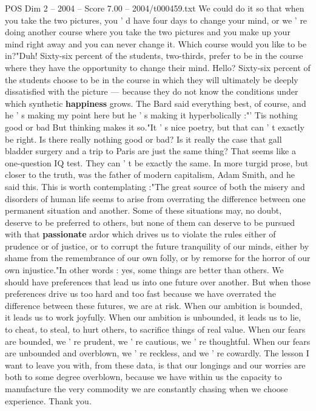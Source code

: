 \begin{textsample}{POS Dim 2 – 2004 – Score 7.00 – 2004/t000459.txt}
We could do it so that when you take the two pictures, you ' d have four days to change your mind, or we ' re doing another course where you take the two pictures and you make up your mind right away and you can never change it.
Which course would you like to be in?"Duh!
Sixty-six percent of the students, two-thirds, prefer to be in the course where they have the opportunity to change their mind.
Hello?
Sixty-six percent of the students choose to be in the course in which they will ultimately be deeply dissatisfied with the picture — because they do not know the conditions under which synthetic \textbf{happiness} grows.
The Bard said everything best, of course, and he ' s making my point here but he ' s making it hyperbolically :"' Tis nothing good or bad But thinking makes it so."It ' s nice poetry, but that can ' t exactly be right.
Is there really nothing good or bad?
Is it really the case that gall bladder surgery and a trip to Paris are just the same thing?
That seems like a one-question IQ test.
They can ' t be exactly the same.
In more turgid prose, but closer to the truth, was the father of modern capitalism, Adam Smith, and he said this.
This is worth contemplating :"The great source of both the misery and disorders of human life seems to arise from overrating the difference between one permanent situation and another.
Some of these situations may, no doubt, deserve to be preferred to others, but none of them can deserve to be pursued with that \textbf{passionate} ardor which drives us to violate the rules either of prudence or of justice, or to corrupt the future tranquility of our minds, either by shame from the remembrance of our own folly, or by remorse for the horror of our own injustice."In other words : yes, some things are better than others.
We should have preferences that lead us into one future over another.
But when those preferences drive us too hard and too fast because we have overrated the difference between these futures, we are at risk.
When our ambition is bounded, it leads us to work joyfully.
When our ambition is unbounded, it leads us to lie, to cheat, to steal, to hurt others, to sacrifice things of real value.
When our fears are bounded, we ' re prudent, we ' re cautious, we ' re thoughtful.
When our fears are unbounded and overblown, we ' re reckless, and we ' re cowardly.
The lesson I want to leave you with, from these data, is that our longings and our worries are both to some degree overblown, because we have within us the capacity to manufacture the very commodity we are constantly chasing when we choose experience.
Thank you.

\end{textsample}

